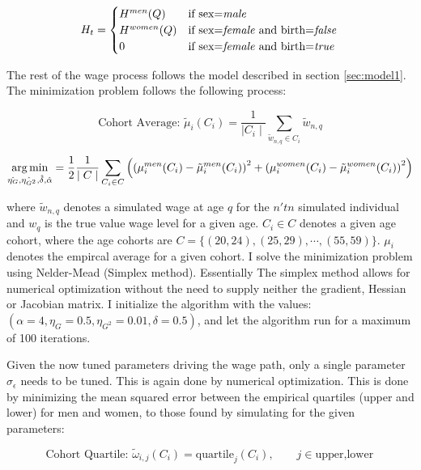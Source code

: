 \begin{equation}
    H_t = \begin{cases}
        H^{men}(Q) & \text{if sex=\textit{male}} \\
        H^{women}(Q) & \text{if sex=\textit{female} and birth=\textit{false}} \\
        0 & \text{if sex=\textit{female} and birth=\textit{true} }\\
    \end{cases}    
\end{equation}

The rest of the wage process follows the model described in section \ref{sec:model1}. The minimization problem follows the following process:

\begin{equation}
    \text{Cohort Average: } {\tilde{\mu}}_i (C_i) = \frac{1}{\mid C_i \mid} \sum_{\tilde{w}_{n, q} \in C_i} {\tilde{w}_{n, q}}
\end{equation}

\begin{equation}
    \underset{\hat{\eta_G}, \hat{\eta_{G^2}}, \hat{\delta}, \hat{\alpha}}{\operatorname*{arg\,min}} = \frac{1}{2}\frac{1}{\mid C \mid } \sum_{C_i \in C} \left(\left( \mu_{i}^{men}(C_i)  - \tilde{\mu}_i^{men}(C_i)\right)^2 + \left( \mu_{i}^{women}(C_i)  - \tilde{\mu}_i^{women}(C_i)\right)^2 \right)
\end{equation}

where $\tilde{w}_{n, q}$ denotes a simulated wage at age $q$ for the $n'tn$ simulated individual and $w_q$ is the true value wage level for a given age. $C_i \in C$ denotes a given age cohort, where the age cohorts are $C=\{(20, 24), (25, 29), \cdots , (55, 59) \}$. $\mu_i$ denotes the empircal average for a given cohort.
I solve the minimization problem using Nelder-Mead (Simplex method). Essentially The simplex method allows for numerical optimization without the need to supply neither the gradient, Hessian or Jacobian matrix. I initialize the algorithm with the values: $(\alpha=4, \eta_G = 0.5, \eta_{G^2}=0.01, \delta=0.5)$, and let the algorithm run for a maximum of 100 iterations. 

Given the now tuned parameters driving the wage path, only a single parameter $\sigma_\epsilon$ needs to be tuned. This is again done by numerical optimization. This is done by minimizing the mean squared error between the empirical quartiles (upper and lower) for men and women, to those found by simulating for the given parameters:

\begin{equation}
    \text{Cohort Quartile: } {\tilde{\omega}}_{i, j} (C_i) = \text{quartile}_j (C_i), \qquad j\in{\text{upper}, \text{lower}} 
\end{equation}

